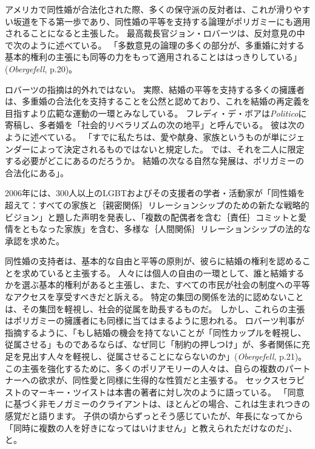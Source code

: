 \documentclass[paper=a4,book,openany]{jlreq}
\newcommand{\ig}[1]{}           %
\begin{document}
アメリカで同性婚が合法化された際、多くの保守派の反対者は、これが滑りやすい坂道を下る第一歩であり、同性婚の平等を支持する論理がポリガミーにも適用されることになると主張した。
最高裁長官ジョン・ロバーツ\ig{John Roberts}は、反対意見の中で次のように述べている。
「多数意見の論理の多くの部分が、多重婚に対する基本的権利の主張にも同等の力をもって適用されることははっきりしている」(\emph{Obergefell}, p.20)。

ロバーツ\ig{John Roberts}の指摘は的外れではない。
実際、結婚の平等を支持する多くの擁護者は、多重婚の合法化を支持することを公然と認めており、これを結婚の再定義を目指すより広範な運動の一環とみなしている。
フレディ・デ・ボアは\emph{Politico}に寄稿し、多者婚を「社会的リベラリズムの次の地平」と呼んでいる。
彼は次のように述べている。
「すでに私たちは、愛や献身、家族というものが単にジェンダーによって決定されるものではないと規定した。
では、それを二人に限定する必要がどこにあるのだろうか。
結婚の次なる自然な発展は、ポリガミーの合法化にある」\citep{deboer15:_it_time_legal_polyg}。

2006年には、300人以上のLGBTおよびその支援者の学者・活動家が「同性婚を超えて：すべての家族と｛親密関係｝{リレーションシップ}のための新たな戦略的ビジョン」と題した声明を発表し、「複数の配偶者を含む｛責任｝{コミット}と愛情をともなった家族」を含む、多様な｛人間関係｝{リレーションシップ}の法的な承認を求めた\citep{MR06:_beyon_same_sex_marriag}。

同性婚の支持者は、基本的な自由と平等の原則が、彼らに結婚の権利を認めることを求めていると主張する。
人々には個人の自由の一環として、誰と結婚するかを選ぶ基本的権利があると主張し、また、すべての市民が社会の制度への平等なアクセスを享受すべきだと訴える。
特定の集団の関係を法的に認めないことは、その集団を軽視し、社会的従属を助長するものだ。
しかし、これらの主張はポリガミーの擁護者にも同様に当てはまるように思われる。
ロバーツ判事\ig{John Roberts}が指摘するように、「もし結婚の機会を持てないことが「同性カップルを軽視し、従属させる」ものであるならば、なぜ同じ「制約の押しつけ」が、多者関係に充足を見出す人々を軽視し、従属させることにならないのか」(\emph{Obergefell}, p.21)。
この主張を強化するために、多くのポリアモリーの人々は、自らの複数のパートナーへの欲求が、同性愛と同様に生得的な性質だと主張する。
セックスセラピストのマーキー・ツイストは本書の著者に対し次のように語っている。
「同意に基づく非モノガミーのクライアントは、ほとんどの場合、これは生まれつきの感覚だと語ります。
子供の頃からずっとそう感じていたが、年長になってから「同時に複数の人を好きになってはいけません」と教えられただけなのだ」、と\citep{mcarthur16:_why_peopl_are_fight_get}。
\end{document}
